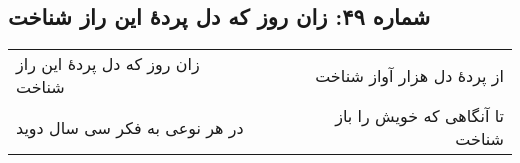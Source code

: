 \begin{center}
\section*{شماره ۴۹: زان روز که دل پردۀ این راز شناخت}
\label{sec:049}
\begin{longtable}{l p{0.5cm} r}
زان روز که دل پردهٔ این راز شناخت
&&
از پردهٔ دل هزار آواز شناخت
\\
در هر نوعی به فکر سی سال دوید
&&
تا آنگاهی که خویش را باز شناخت
\\
\end{longtable}
\end{center}
